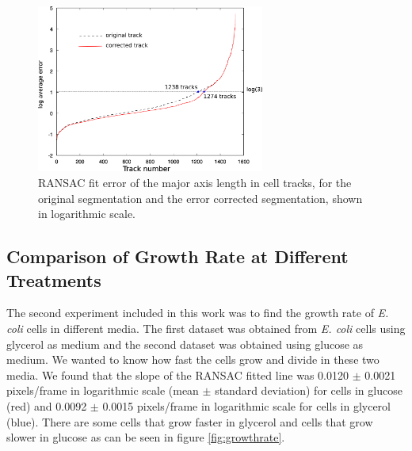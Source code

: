 \documentclass[journal]{IEEEtran}
\begin{document}
\begin{figure}[h]
	\begin{center}
		
		\includegraphics[width=7.5cm]{correcttrack2.png}					
		\caption{RANSAC fit error of the major axis length in cell tracks, for the original segmentation and the error corrected segmentation, shown in logarithmic scale.}
		\label{fig:correcttrack}
	\end{center}
\end{figure}

\subsection{Comparison of Growth Rate at Different Treatments}
The second experiment included in this work was to find the growth rate of \textit{E. coli} cells in different media. The first dataset was obtained from \textit{E. coli} cells using glycerol as medium and the second dataset was obtained using glucose as medium. We wanted to know how fast the cells grow and divide in these two media. We found that the slope of the RANSAC fitted line was 0.0120 $\pm$ 0.0021 pixels/frame in logarithmic scale (mean $\pm$ standard deviation) for cells in glucose (red) and 0.0092 $\pm$ 0.0015 pixels/frame in logarithmic scale for cells in glycerol (blue). There are some cells that grow faster in glycerol and cells that grow slower in glucose as can be seen in figure \ref{fig:growthrate}.
\end{document}
